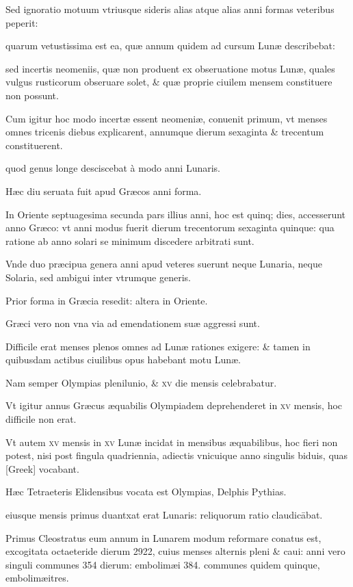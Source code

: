 \begin{parnumbers}

Sed ignoratio
motuum vtriusque sideris alias atque alias anni formas veteribus
peperit:

quarum vetustissima est ea, quæ annum quidem ad cursum
Lunæ describebat:

sed incertis neomeniis, quæ non produent ex obseruatione
motus Lunæ, quales vulgus rusticorum obseruare solet, \&
quæ proprie ciuilem mensem constituere non possunt.

Cum igitur
hoc modo incertæ essent neomeniæ, conuenit primum, vt menses omnes
tricenis diebus explicarent, annumque dierum sexaginta \& trecentum
constituerent.

quod genus longe desciscebat à modo anni
Lunaris.

Hæc diu seruata fuit apud Græcos anni forma.

In Oriente
septuagesima secunda pars illius anni, hoc est quinq; dies, accesserunt
anno Græco: vt anni modus fuerit dierum trecentorum sexaginta quinque:
qua ratione ab anno solari se minimum discedere arbitrati sunt.

Vnde duo præcipua genera anni apud veteres suerunt neque Lunaria,
neque Solaria, sed ambigui inter vtrumque generis.

Prior forma in Græcia resedit: altera in Oriente.

Græci vero non vna via ad emendationem
suæ aggressi sunt.

Difficile erat menses plenos omnes ad
Lunæ rationes exigere: \& tamen in quibusdam actibus ciuilibus opus
habebant motu Lunæ.

Nam semper Olympias plenilunio, \& \textsc{xv}
die mensis celebrabatur.

Vt igitur annus Græcus æquabilis Olympiadem
deprehenderet in \textsc{xv} mensis, hoc difficile non erat.

Vt autem
\textsc{xv} mensis in \textsc{xv}
 Lunæ incidat in mensibus æquabilibus, hoc fieri non
potest, nisi post fingula quadriennia, adiectis vnicuique anno singulis
biduis, quas \textgreek{[Greek]} vocabant.

Hæc Tetraeteris Elidensibus
vocata est Olympias, Delphis Pythias.

eiusque mensis primus duantxat
erat Lunaris: reliquorum ratio claudicābat.

Primus Cleostratus
eum annum in Lunarem modum reformare conatus est, excogitata
octaeteride dierum 2922, cuius menses alternis pleni \& caui: anni vero
singuli communes 354 dierum: embolimæi 384. communes quidem
quinque, embolimæitres.


\end{parnumbers}
